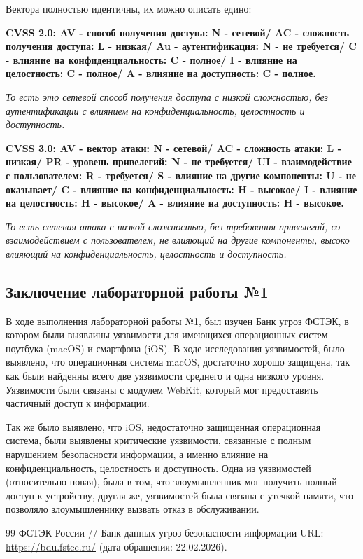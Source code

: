 \documentclass[areasetadvanced]{scrartcl}
\begin{document}
Вектора полностью идентичны, их можно описать едино:

\textbf{CVSS 2.0: AV - способ получения доступа: N - сетевой/ AC - сложность получения доступа: L - низкая/
Au - аутентификация: N - не требуется/ C - влияние на конфиденциальность: C - полное/ I - влияние
на целостность: C - полное/ A - влияние на доступность: C - полное.}

\emph{То есть это сетевой способ получения доступа с низкой сложностью, без аутентификации с влиянием на конфиденциальность, целостность и доступность.}

\textbf{CVSS 3.0: AV - вектор атаки: N - сетевой/ AC - сложность атаки: L - низкая/ PR - уровень привелегий: N - не требуется/ UI - взаимодействие с пользователем: R - требуется/ S - влияние на другие компоненты:
U - не оказывает/ C - влияние на конфиденциальность: H - высокое/ I - влияние
на целостность: H - высокое/ A - влияние на доступность: H - высокое.}

\emph{То есть сетевая атака с низкой сложностью, без требования привелегий, со взаимодействием с пользователем, не влияющий на другие компоненты, высоко влияющий на конфиденциальность, целостность и доступность.}

\subsection*{Заключение лабораторной работы №1}
В ходе выполнения лабораторной работы №1, был изучен Банк угроз ФСТЭК, в котором были выявлины уязвимости для имеющихся операционных систем ноутбука (macOS) и смартфона (iOS). 
В ходе исследования уязвимостей, было выявлено, что операционная система macOS, достаточно хорошо защищена, так как были найденны всего две уязвимости среднего и одна низкого уровня. 
Уязвимости были связаны с модулем WebKit, который мог предоставить частичный доступ к информации. 

Так же было выявлено, что iOS, недостаточно защищенная операционная система, были выявлены критические уязвимости, связанные с полным нарушением безопасности информации, а именно влияние на конфиденциальность, целостность и доступность.
Одна из уязвимостей (относительно новая), была в том, что злоумышленник мог получить полный доступ к устройству, другая же, уязвимостей была связана с утечкой памяти, что позволяло злоумышленнику вызвать отказ в обслуживании.


\begin{thebibliography}{99}
ФСТЭК России // Банк данных угроз безопасности информации URL: \url{https://bdu.fstec.ru/} (дата обращения: 22.02.2026).
\end{thebibliography}
\end{document}
